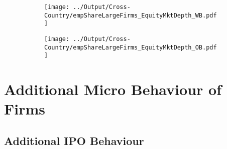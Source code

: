 \documentclass[12pt,notitlepage]{article}
\begin{document}
\begin{figure}[!htpb]
\centering
\caption{Share of Employment in Large Firms}
\begin{subfigure}{.49\textwidth}
    \centering
 \texttt{[image: ../Output/Cross-Country/empShareLargeFirms\_EquityMktDepth\_WB.pdf]}
\end{subfigure}
\begin{subfigure}{.49\textwidth}
    \centering
  \texttt{[image: ../Output/Cross-Country/empShareLargeFirms\_EquityMktDepth\_OB.pdf]}
\end{subfigure}
\end{figure}
\FloatBarrier


\FloatBarrier
\section{Additional Micro Behaviour of Firms} %
\label{sec:additional_micro_behaviour_of_firms}
\FloatBarrier


\subsection{Additional IPO Behaviour} %
\label{sec:additional_ipo_behaviour}

\begin{table}[!htpb]
\caption{Number of data points x years after an IPO (cumulative)}
    \begin{center}
    \end{center}
\end{table}
\end{document}
